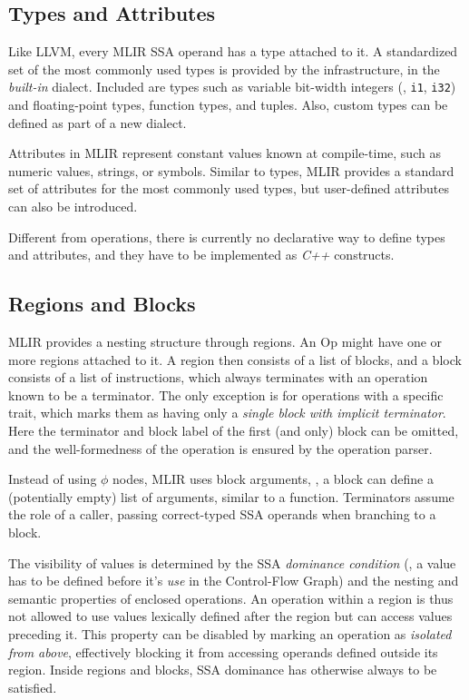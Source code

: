 \subsection{Types and Attributes}
\label{sec:mlir_types}
Like LLVM, every MLIR SSA operand has a type attached to it. A standardized set of the most commonly used types is provided by the infrastructure, in the \textit{built-in} dialect. Included are types such as variable bit-width integers (\eg, \texttt{i1}, \texttt{i32}) and floating-point types, function types, and tuples. Also, custom types can be defined as part of a new dialect.

Attributes in MLIR represent constant values known at compile-time, such as numeric values, strings, or symbols. Similar to types, MLIR provides a standard set of attributes for the most commonly used types, but user-defined attributes can also be introduced.

Different from operations, there is currently no declarative way to define types and attributes, and they have to be implemented as \textit{C++} constructs.


\subsection{Regions and Blocks}
MLIR provides a nesting structure through regions. An Op might have one or more regions attached to it. A region then consists of a list of blocks, and a block consists of a list of instructions, which always terminates with an operation known to be a terminator. The only exception is for operations with a specific trait, which marks them as having only a \textit{single block with implicit terminator}. Here the terminator and block label of the first (and only) block can be omitted, and the well-formedness of the operation is ensured by the operation parser.

Instead of using $\phi$ nodes, MLIR uses block arguments, \ie, a block can define a (potentially empty) list of arguments, similar to a function. Terminators assume the role of a caller, passing correct-typed SSA operands when branching to a block.

The visibility of values is determined by the SSA \textit{dominance condition} (\ie, a value has to be defined before it's \textit{use} in the Control-Flow Graph) and the nesting and semantic properties of enclosed operations. An operation within a region is thus not allowed to use values lexically defined after the region but can access values preceding it. This property can be disabled by marking an operation as \textit{isolated from above}, effectively blocking it from accessing operands defined outside its region. Inside regions and blocks, SSA dominance has otherwise always to be satisfied.

